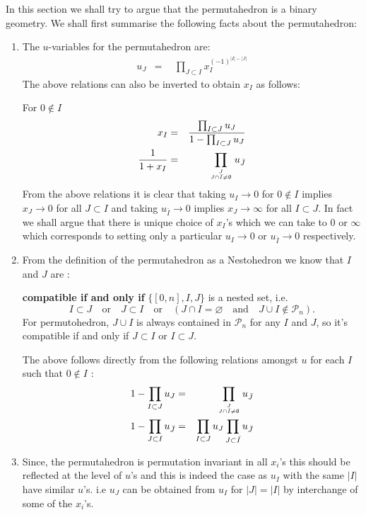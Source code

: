 \documentclass[hidelinks,12pt]{article}
\newcommand{\bea}[1]{\begin{eqnarray}\label{#1} }
\newcommand{\eea}{\end{eqnarray}}
\def\bea{\begin{eqnarray}}
\def\eea{\end{eqnarray}}
\begin{document}
In this section we shall try to argue that the permutahedron is a binary geometry. We shall first summarise the following facts about the permutahedron:
\begin{enumerate}
\item The $u$-variables for the permutahedron are: 
\bea
u_J &=& ~~\prod_{J \subset I} x_I^{(-1)^{|I|-|J|}} \nonumber 
\eea
The above relations can also be inverted to obtain $x_I$ as follows:

For $0 \notin I $
\bea
x_I &=& \frac{\prod_{I \subset J} u_{J}}{1-\prod_{I \subset J} u_{J}} \\
\frac{1}{1+ x_I} &=& \prod_{{J}\atop{J\cap \bar{I} \ne \emptyset}} u_{\bar{J}}
\eea
From the above relations it is clear that taking $u_I \rightarrow 0$ for $0 \notin I$ implies $x_J \rightarrow 0$ for all $J \subset I$ and taking $u_{\bar{I}} \rightarrow 0$ implies $x_J \rightarrow \infty $ for all $I \subset J$.
In fact we shall argue that there is unique choice of $x_I$'s which we can take to $0$ or $\infty$ which corresponds to setting only a particular $u_I \rightarrow 0$ or $u_{\bar{I}} \rightarrow 0$ respectively.
\item From the definition of the permutahedron as a Nestohedron we know that $I$ and $J$ are :



{\bf compatible if and only if} $\{[0,n],I,J\}$ is a nested set, i.e.
\[
I\subset J\quad \text{or}\quad J\subset I\quad \text{or}\quad (J\cap I=\varnothing \quad \text{and}\quad J\cup I\not\in \mathscr P_n).
\]
For permutohedron, $J\cup I$ is always contained in $\mathscr P_n$ for any $I$ and $J$, so it's compatible if and only if $J\subset I$ or $I\subset J$.

The above  follows directly from the following relations amongst $u$ for each $I$ such that $0\notin I$ :
\bea
1-\prod_{I \subset J} u_{J} &=& \prod_{{J}\atop{J\cap \bar{I} \ne \emptyset}} u_{\bar{J}} \\
1-\prod_{J \subset I} u_{\bar{J}} &=& \prod_{I \subset J} u_{J} \prod_{J \subset \bar{I} } u_{\bar{J}}
\eea


\item  Since, the permutahedron is permutation invariant in all $x_i$'s this should be reflected at the level of $u$'s and this is indeed the case as $u_I$ with the same $|I|$ have similar $u$'s. i.e $u_J$ can be obtained from $u_I$ for $|J|=|I|$ by interchange of some of the $x_i$'s.


\end{enumerate}
\end{document}
